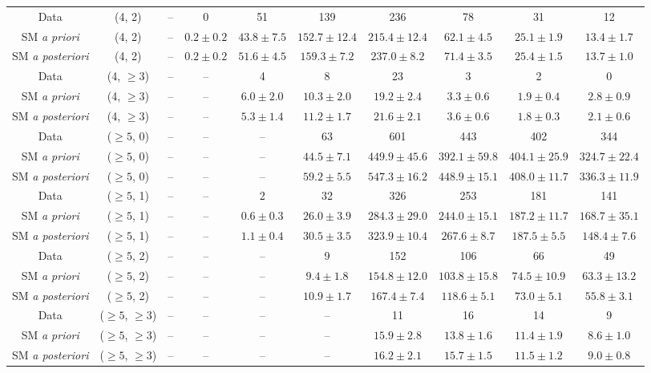 \begin{table}[h!]
{\begin{tabular}{cccccccccc}
	Data & (4, 2) & -- & 0 & 51 & 139 & 236 & 78 & 31 & 12 \\[0.5ex] 
	SM \textit{a priori} & (4, 2) & -- & $0.2\pm 0.2$ & $43.8\pm 7.5$ & $152.7\pm 12.4$ & $215.4\pm 12.4$ & $62.1\pm 4.5$ & $25.1\pm 1.9$ & $13.4\pm 1.7$ \\[0.5ex] 
	SM \textit{a posteriori} & (4, 2) & -- & $0.2\pm 0.2$ & $51.6\pm 4.5$ & $159.3\pm 7.2$ & $237.0\pm 8.2$ & $71.4\pm 3.5$ & $25.4\pm 1.5$ & $13.7\pm 1.0$ \\[0.5ex] 
	Data & (4, $\ge3$) & -- & -- & 4 & 8 & 23 & 3 & 2 & 0 \\[0.5ex] 
	SM \textit{a priori} & (4, $\ge3$) & -- & -- & $6.0\pm 2.0$ & $10.3\pm 2.0$ & $19.2\pm 2.4$ & $3.3\pm 0.6$ & $1.9\pm 0.4$ & $2.8\pm 0.9$ \\[0.5ex] 
	SM \textit{a posteriori} & (4, $\ge3$) & -- & -- & $5.3\pm 1.4$ & $11.2\pm 1.7$ & $21.6\pm 2.1$ & $3.6\pm 0.6$ & $1.8\pm 0.3$ & $2.1\pm 0.6$ \\[0.5ex] 
	Data & ($\ge5$, 0) & -- & -- & -- & 63 & 601 & 443 & 402 & 344 \\[0.5ex] 
	SM \textit{a priori} & ($\ge5$, 0) & -- & -- & -- & $44.5\pm 7.1$ & $449.9\pm 45.6$ & $392.1\pm 59.8$ & $404.1\pm 25.9$ & $324.7\pm 22.4$ \\[0.5ex] 
	SM \textit{a posteriori} & ($\ge5$, 0) & -- & -- & -- & $59.2\pm 5.5$ & $547.3\pm 16.2$ & $448.9\pm 15.1$ & $408.0\pm 11.7$ & $336.3\pm 11.9$ \\[0.5ex] 
	Data & ($\ge5$, 1) & -- & -- & 2 & 32 & 326 & 253 & 181 & 141 \\[0.5ex] 
	SM \textit{a priori} & ($\ge5$, 1) & -- & -- & $0.6\pm 0.3$ & $26.0\pm 3.9$ & $284.3\pm 29.0$ & $244.0\pm 15.1$ & $187.2\pm 11.7$ & $168.7\pm 35.1$ \\[0.5ex] 
	SM \textit{a posteriori} & ($\ge5$, 1) & -- & -- & $1.1\pm 0.4$ & $30.5\pm 3.5$ & $323.9\pm 10.4$ & $267.6\pm 8.7$ & $187.5\pm 5.5$ & $148.4\pm 7.6$ \\[0.5ex] 
	Data & ($\ge5$, 2) & -- & -- & -- & 9 & 152 & 106 & 66 & 49 \\[0.5ex] 
	SM \textit{a priori} & ($\ge5$, 2) & -- & -- & -- & $9.4\pm 1.8$ & $154.8\pm 12.0$ & $103.8\pm 15.8$ & $74.5\pm 10.9$ & $63.3\pm 13.2$ \\[0.5ex] 
	SM \textit{a posteriori} & ($\ge5$, 2) & -- & -- & -- & $10.9\pm 1.7$ & $167.4\pm 7.4$ & $118.6\pm 5.1$ & $73.0\pm 5.1$ & $55.8\pm 3.1$ \\[0.5ex] 
	Data & ($\ge5$, $\ge3$) & -- & -- & -- & -- & 11 & 16 & 14 & 9 \\[0.5ex] 
	SM \textit{a priori} & ($\ge5$, $\ge3$) & -- & -- & -- & -- & $15.9\pm 2.8$ & $13.8\pm 1.6$ & $11.4\pm 1.9$ & $8.6\pm 1.0$ \\[0.5ex] 
	SM \textit{a posteriori} & ($\ge5$, $\ge3$) & -- & -- & -- & -- & $16.2\pm 2.1$ & $15.7\pm 1.5$ & $11.5\pm 1.2$ & $9.0\pm 0.8$ \\[0.5ex] 
	\hline
	\hline
\end{tabular}}
\end{table}
